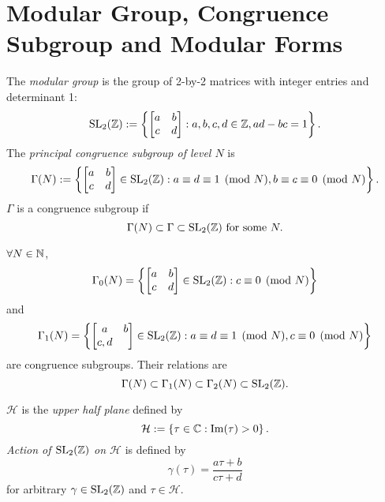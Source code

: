 
\section{Modular Group, Congruence Subgroup and Modular Forms}
\begin{definition}
  The \textit{modular group} is the group of 2-by-2 matrices with integer entries and determinant 1:
  \begin{equation*}
    \operatorname{SL}_2(\mathbb{Z}):=\left\{ \begin{bmatrix} a & b\\
    c & d\end{bmatrix}:a,b,c,d\in \mathbb{Z},ad-bc=1  \right\} .
  \end{equation*}
  The \textit{principal congruence subgroup of level $N$} is 
  \begin{equation*}
    \Gamma(N):=\left\{ \begin{bmatrix} a&b\\
    c&d\end{bmatrix} \in \operatorname{SL}_2(\mathbb{Z}):a\equiv d\equiv 1\pmod{N},  b\equiv c\equiv 0 \pmod{N}\right\} 
 . \end{equation*}
 $\Gamma$ is a congruence subgroup if 
 \[
   \Gamma(N)\subset \Gamma\subset \operatorname{SL}_2(\mathbb{Z}) \text{ for some }N.
 \] 
\end{definition}
\begin{example}
  $\forall N\in \mathbb{N}$, 
  \[
    \Gamma_0(N)=\left\{ \begin{bmatrix} a&b\\c&d \end{bmatrix} \in \operatorname{SL}_2(\mathbb{Z}):c\equiv 0 \pmod{N} \right\} 
  \]
  and 
  \[
    \Gamma_1(N)=\left\{ \begin{bmatrix} a&b\\c,d \end{bmatrix} \in \operatorname{SL}_2(\mathbb{Z}):a\equiv d\equiv 1\pmod{N}, c\equiv 0\pmod{N} \right\} 
  \] 
  are congruence subgroups. Their relations are
  \[
    \Gamma(N)\subset \Gamma_1(N)\subset \Gamma_2(N)\subset \operatorname{SL}_2(\mathbb{Z}).
  \] 		

\end{example}
\begin{definition}
   $\mathcal{H}$ is the \textit{upper half plane} defined by 
   \[
     \mathcal{H}:=\left\{ \tau \in \mathbb{C}:\operatorname{Im}(\tau)>0 \right\} 
   .\]
   \textit{Action of $\operatorname{SL}_2(\mathbb{Z})$ on $\mathcal{H}$} is defined by
   \[
     \gamma(\tau)= \frac{a\tau+b}{c\tau+d}
   \] 
  for arbitrary $\gamma \in \operatorname{SL}_2(\mathbb{Z})$ and $\tau \in \mathcal{H}$.
   
\end{definition}

